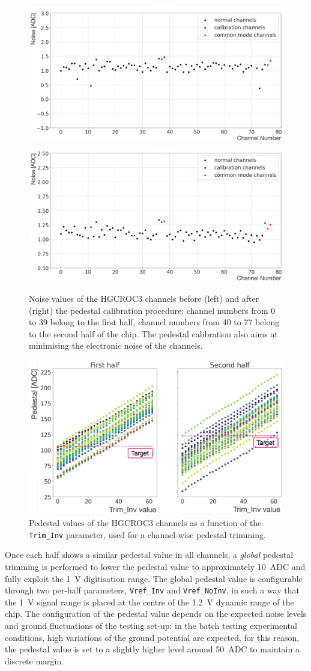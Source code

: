 \begin{figure}
    \centering
    \includegraphics[width=0.49\linewidth]{Figures/HGCAL/Noise_0.pdf}
    \includegraphics[width=0.49\linewidth]{Figures/HGCAL/Noise_1.pdf}
    \caption{Noise values of the HGCROC3 channels before (left) and after (right) the pedestal calibration procedure: channel numbers from 0 to 39 belong to the first half, channel numbers from 40 to 77 belong to the second half of the chip. The pedestal calibration also aims at minimising the electronic noise of the channels.}
    \label{fig:Noise}
\end{figure}

\begin{figure} 
    \centering
    \includegraphics[width=0.7\linewidth]{Figures/HGCAL/PedestalScan.pdf}
    \caption{Pedestal values of the HGCROC3 channels as a function of the \texttt{Trim\_Inv} parameter, used for a channel-wise pedestal trimming.}
    \label{fig:PedestalScan}
\end{figure}

Once each half shows a similar pedestal value in all channels, a \textit{global} pedestal trimming is performed to lower the pedestal value to approximately 10~ADC and fully exploit the 1~V digitisation range.
The global pedestal value is configurable through two per-half parameters, \texttt{Vref\_Inv} and \texttt{Vref\_NoInv}, in such a way that the 1~V signal range is placed at the centre of the 1.2~V dynamic range of the chip.
The configuration of the pedestal value depends on the expected noise levels and ground fluctuations of the testing set-up: in the batch testing experimental conditions, high variations of the ground potential are expected, for this reason, the pedestal value is set to a slightly higher level around 50~ADC to maintain a discrete margin.


